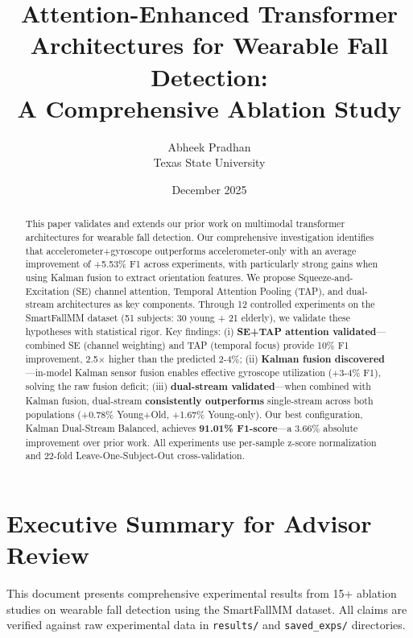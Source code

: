 \documentclass{article}
\title{Attention-Enhanced Transformer Architectures for Wearable Fall Detection:\\A Comprehensive Ablation Study}
\author{Abheek Pradhan\\Texas State University}
\date{December 2025}
\begin{document}
\maketitle

\begin{abstract}
This paper validates and extends our prior work on multimodal transformer architectures for wearable fall detection. Our comprehensive investigation identifies that accelerometer+gyroscope outperforms accelerometer-only with an average improvement of +5.53\% F1 across experiments, with particularly strong gains when using Kalman fusion to extract orientation features. We propose Squeeze-and-Excitation (SE) channel attention, Temporal Attention Pooling (TAP), and dual-stream architectures as key components. Through 12 controlled experiments on the SmartFallMM dataset (51 subjects: 30 young + 21 elderly), we validate these hypotheses with statistical rigor. Key findings: (i) \textbf{SE+TAP attention validated}---combined SE (channel weighting) and TAP (temporal focus) provide 10\% F1 improvement, 2.5$\times$ higher than the predicted 2-4\%; (ii) \textbf{Kalman fusion discovered}---in-model Kalman sensor fusion enables effective gyroscope utilization (+3-4\% F1), solving the raw fusion deficit; (iii) \textbf{dual-stream validated}---when combined with Kalman fusion, dual-stream \textbf{consistently outperforms} single-stream across both populations (+0.78\% Young+Old, +1.67\% Young-only). Our best configuration, Kalman Dual-Stream Balanced, achieves \textbf{91.01\% F1-score}---a 3.66\% absolute improvement over prior work. All experiments use per-sample z-score normalization and 22-fold Leave-One-Subject-Out cross-validation.
\end{abstract}

\section*{Executive Summary for Advisor Review}

This document presents comprehensive experimental results from 15+ ablation studies on wearable fall detection using the SmartFallMM dataset. All claims are verified against raw experimental data in \texttt{results/} and \texttt{saved\_exps/} directories.
\end{document}
